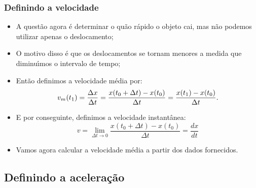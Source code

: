 \documentclass[notes=show]{beamer}
\begin{document}
\begin{frame}%

\frametitle{Definindo a velocidade}

\begin{itemize}
	\item A quest\~{a}o agora \'{e} determinar o qu\~{a}o r\'{a}pido o objeto
	cai, mas n\~{a}o podemos utilizar apenas o deslocamento;
	
	\item O motivo disso \'{e} que os deslocamentos se tornam menores a medida
	que diminu\'{\i}mos o intervalo de tempo;
	\item Ent\~{a}o definimos a velocidade m\'{e}dia por:%
	\[
	v_{m}(t_{1})=\frac{\Delta x}{\Delta t}=\frac{x(t_{0}+\Delta t)-x(t_{0})}{%
		\Delta t}=\frac{x(t_{1})-x(t_{0})}{\Delta t}.
	\]
	
	\item E por conseguinte, definimos a velocidade instant\^{a}nea:%
	\[
	v=\lim_{\Delta t\rightarrow 0}\frac{x(t_{0}+\Delta t)-x(t_{0})}{\Delta t}=%
	\frac{dx}{dt}
	\]
	
	\item Vamos agora calcular a velocidade m\'{e}dia a partir dos dados
	fornecidos.
\end{itemize}

\transboxout%
\end{frame}%
\subsection{Definindo a acelera\c{c}\~{a}o}
\end{document}
